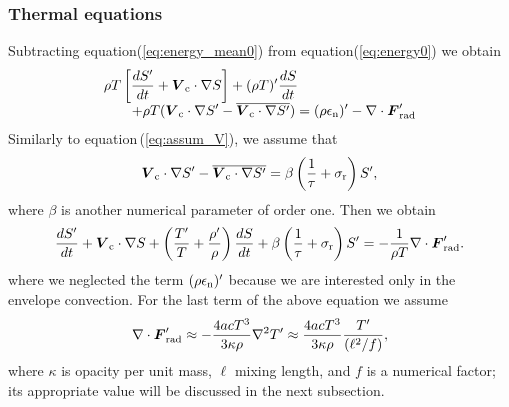 \documentclass[fleqn,usenatbib]{mnras}
\def\bm#1{\mbox{\boldmath$#1$}}
\begin{document}
\subsubsection{Thermal equations}
Subtracting equation(\ref{eq:energy_mean0}) from equation(\ref{eq:energy0}) we obtain
\begin{equation}
\begin{array}{l} \displaystyle
\rho T\left[{dS'\over dt} +\bm{V}_{\rm c}\cdot\nabla S\right] 
+ (\rho T)'{dS\over dt} 
\cr \displaystyle \qquad
+\rho T(\bm{V}_{\rm c}\cdot\nabla S'
- \overline{\bm{V}_{\rm c}\cdot\nabla S'})
= (\rho\epsilon_{\rm n})' - \nabla\cdot\bm{F}_{\rm rad}'
\end{array}
\label{eq:energy_conv0}
\end{equation} 
Similarly to equation\,(\ref{eq:assum_V}), we assume that
\begin{equation}
\bm{V}_{\rm c}\cdot\nabla S' 
- \overline{\bm{V}_{\rm c}\cdot\nabla S'} 
= \beta\left({1\over\tau}+\sigma_{\rm r}\right) S',
\end{equation}
where $\beta$ is another numerical parameter of order one.
Then we obtain
\begin{equation}
{dS'\over dt} +\bm{V}_{\rm c}\cdot\nabla S 
 + \left({T'\over T}+{\rho'\over\rho}\right){dS\over dt} 
 +\beta\left({1\over\tau}+\sigma_{\rm r}\right) S'
=- {1\over\rho T}\nabla\cdot\bm{F}'_{\rm rad}.
\label{eq:energy_conv1}
\end{equation} 
where we neglected the term $(\rho\epsilon_{\rm n})'$ because
we are interested only in the envelope convection.
For the last term of the above equation we assume
\begin{equation}
\nabla\cdot\bm{F}'_{\rm rad}\approx -{4acT^3\over 3\kappa\rho}\nabla^2 T'
\approx {4acT^3\over 3\kappa\rho}{T'\over (\ell^2/f)},
\end{equation}
where $\kappa$ is opacity per unit mass, $\ell$  mixing length, 
and $f$ is a numerical factor; its appropriate value
will be discussed in the next subsection.
\end{document}
